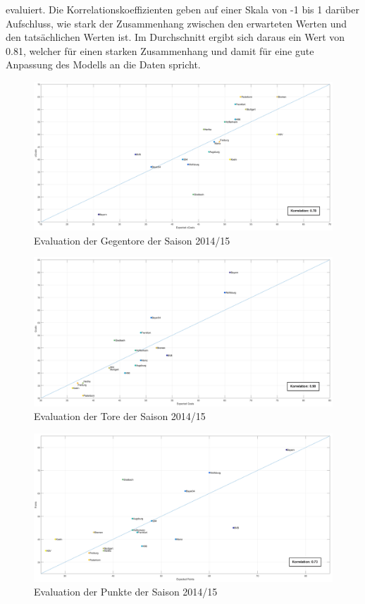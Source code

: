 evaluiert. Die Korrelationskoeffizienten geben auf einer Skala von -1 bis 1 darüber Aufschluss, wie stark der Zusammenhang zwischen den erwarteten Werten und den tatsächlichen Werten ist. Im Durchschnitt ergibt sich daraus ein Wert von \textsf{0.81}, welcher für einen starken Zusammenhang und damit für eine gute Anpassung des Modells an die Daten spricht.


\begin{figure}
\centering
\includegraphics[scale=0.3]{se-wa-jpg/cGoals_correlation_14_15}
\caption{Evaluation der Gegentore der Saison 2014/15}
\label{cg1415}
\end{figure}

\begin{figure}
\centering
\includegraphics[scale=0.3]{se-wa-jpg/goals_correlation_14_15}
\caption{Evaluation der Tore der Saison 2014/15}
\label{g1415}
\end{figure}

\begin{figure}
\centering
\includegraphics[scale=0.3]{se-wa-jpg/points_correlation_14_15}
\caption{Evaluation der Punkte der Saison 2014/15}
\label{p1415}
\end{figure}

